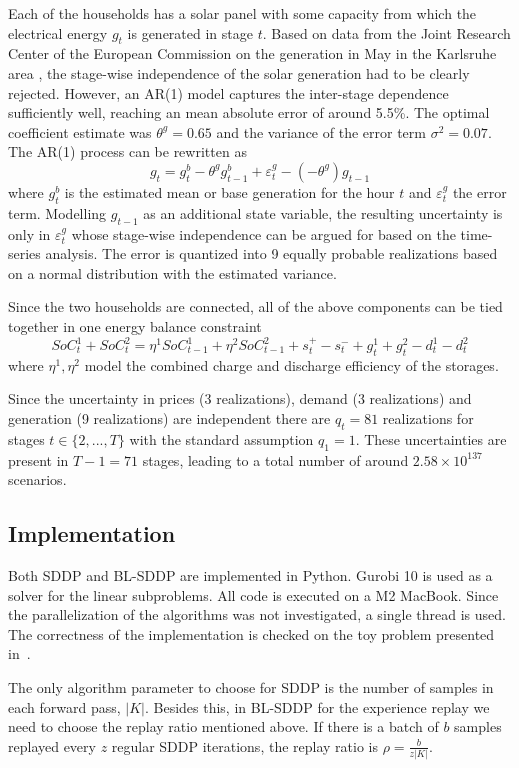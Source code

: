 \documentclass[a4paper,12pt]{article}
\begin{document}
Each of the households has a solar panel with some capacity from which the electrical energy $g_t$ is generated in stage $t$. 
Based on data from the Joint Research Center of the European Commission on the generation in May in the Karlsruhe area \cite{gonzalez2017solar}, the stage-wise independence of the solar generation had to be clearly rejected. However, an AR(1) model captures the inter-stage dependence sufficiently well, reaching an mean absolute error of around 5.5\%. The optimal coefficient estimate was $\theta^g = 0.65$ and the variance of the error term $\sigma^2 = 0.07$.
The AR(1) process can be rewritten as
\[g_t = g^b_t - \theta^g g^b_{t-1} + \varepsilon^g_t - (-\theta^g)g_{t-1}  \]
where $g^b_t$ is the estimated mean or base generation for the hour $t$ and $\varepsilon^g_t$ the error term. Modelling $g_{t-1}$ as an additional state variable, the resulting uncertainty is only in $\varepsilon^g_t$ whose stage-wise independence can be argued for based on the time-series analysis.
The error is quantized into 9 equally probable realizations based on a normal distribution with the estimated variance.

Since the two households are connected, all of the above components can be tied together in one energy balance constraint
\[SoC^1_t + SoC^2_t = \eta^1 SoC^1_{t-1} + \eta^2 SoC^2_{t-1} + s^+_t - s^-_t + g^1_t + g^2_t - d^1_t - d^2_t  \]
where $\eta^1, \eta^2$ model the combined charge and discharge efficiency of the storages.

Since the uncertainty in prices (3 realizations), demand (3 realizations) and generation (9 realizations) are independent there are $q_t = 81$ realizations for stages $t \in \{2,...,T\}$ with the standard assumption $q_1 = 1$.
These uncertainties are present in $T-1 = 71$ stages, leading to a total number of around $2.58 \times 10^{137}$ scenarios.

\subsection{Implementation}
Both SDDP and BL-SDDP are implemented in Python. Gurobi 10 is used as a solver for the linear subproblems. All code is executed on a M2 MacBook. Since the parallelization of the algorithms was not investigated, a single thread is used. The correctness of the implementation is checked on the toy problem presented in~\cite{fuellner2021stochastic}.

The only algorithm parameter to choose for SDDP is the number of samples in each forward pass, $|K|$. 
Besides this, in BL-SDDP for the experience replay we need to choose the replay ratio mentioned above. If there is a batch of $b$ samples replayed every $z$ regular SDDP iterations, the replay ratio is $\rho = \frac{b}{z |K|}$.
\end{document}
